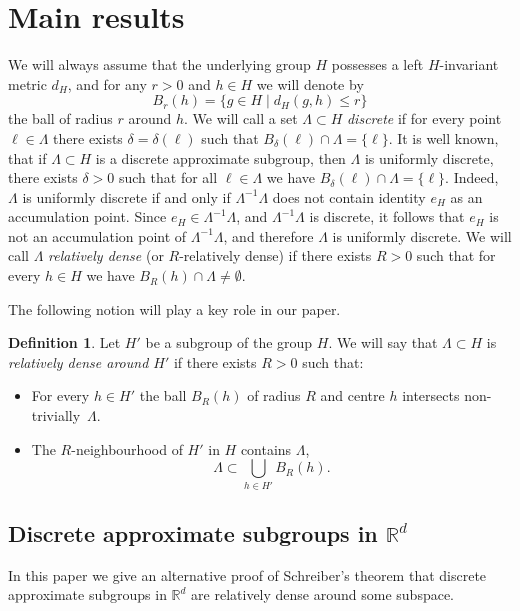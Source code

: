 \documentclass[JEP,XML,SOM,Unicode,NoEqCountersInSection]{cedram}
\newcommand{\bR}{\mathbb{R}}
\newcounter{dummy} \numberwithin{dummy}{section}
\theoremstyle{plain}
\theoremstyle{definition}
\newtheorem{mydef}[dummy]{Definition}
\begin{document}
\section{Main results}
We will always assume that the underlying group $H$ possesses a left $H$-invariant metric $d_H$, and for any $r > 0$ and $h \in H$ we will denote by $$B_r(h) = \{ g \in H \mid d_H(g,h) \le r\}$$ the ball of radius $r$ around $h$. We will call a set $\Lambda \subset H$ \textit{discrete} if for every point $\ell \in \Lambda$ there exists $\delta = \delta(\ell)$ such that $B_{\delta}(\ell) \cap \Lambda = \{ \ell\}$. It is well known, that if $\Lambda \subset H$ is a discrete approximate subgroup, then $\Lambda$ is uniformly discrete, \ie there exists $\delta > 0$ such that for all $\ell \in \Lambda$ we have $B_{\delta}(\ell) \cap \Lambda = \{\ell\}$. Indeed, $\Lambda$ is uniformly discrete if and only if $\Lambda^{-1}\Lambda$ does not contain identity $e_H$ as an accumulation point.
Since $e_H \in \Lambda^{-1}\Lambda$, and $\Lambda^{-1}\Lambda$ is discrete, it follows that $e_H$ is not an accumulation point of $\Lambda^{-1}\Lambda$, and therefore $\Lambda$ is uniformly discrete. We will call $\Lambda$ \textit{relatively dense} (or $R$-relatively dense) if there exists $R > 0$ such that for every $h \in H$ we have $B_R(h) \cap \Lambda \neq \emptyset$.

The following notion will play a key role in our paper.

\begin{mydef}
\label{rel-dense-def}
Let $H'$ be a subgroup of the group $H$. We will say that $\Lambda \subset H$ is \textit{relatively dense around $H'$} if there exists $R > 0$ such that:
\begin{itemize}
\item For every $h\!\in\!H'$ the ball $B_{R}(h)$ of radius $R$ and centre $h$ intersects non-trivially~$\Lambda$.
\item The $R$-neighbourhood of $H'$ in $H$ contains $\Lambda$, \ie\vspace*{-3pt}
\[
\Lambda \subset \bigcup_{h \in H'} B_{R}(h).
\]
\end{itemize}
\end{mydef}

\subsection{Discrete approximate subgroups in $\bR^d$}

In this paper we give an alternative proof of Schreiber's theorem \cite{S} that discrete approximate subgroups in $\bR^d$ are relatively dense around some subspace.
\end{document}
